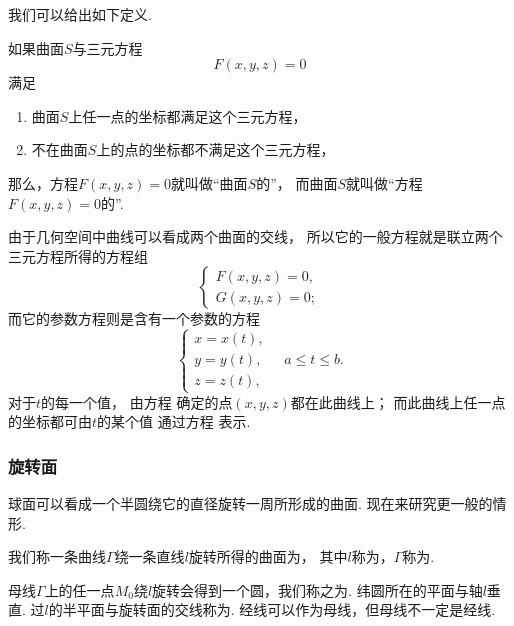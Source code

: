 我们可以给出如下定义.
\begin{definition}
如果曲面\(S\)与三元方程\[
	F(x,y,z)=0
\]满足
\begin{enumerate}
	\item 曲面\(S\)上任一点的坐标都满足这个三元方程，
	\item 不在曲面\(S\)上的点的坐标都不满足这个三元方程，
\end{enumerate}
那么，方程\(F(x,y,z)=0\)就叫做“曲面\(S\)的”，
而曲面\(S\)就叫做“方程\(F(x,y,z)=0\)的”.
\end{definition}

由于几何空间中曲线可以看成两个曲面的交线，
所以它的一般方程就是联立两个三元方程所得的方程组\[
	\left\{ \begin{array}{l}
		F(x,y,z) = 0, \\
		G(x,y,z) = 0;
	\end{array} \right.
\]
而它的参数方程则是含有一个参数的方程
\begin{equation}\label{equation:解析几何.曲线的参数方程}
	\left\{ \begin{array}{l}
		x = x(t), \\
		y = y(t), \\
		z = z(t),
	\end{array} \right.
	\quad
	a \leq t \leq b.
\end{equation}
对于\(t\)的每一个值，
由方程  确定的点\((x,y,z)\)都在此曲线上；
而此曲线上任一点的坐标都可由\(t\)的某个值
通过方程  表示.

\subsubsection{旋转面}
球面可以看成一个半圆绕它的直径旋转一周所形成的曲面.
现在来研究更一般的情形.

我们称一条曲线\(\Gamma\)绕一条直线\(l\)旋转所得的曲面为，
其中\(l\)称为，\(\Gamma\)称为.

母线\(\Gamma\)上的任一点\(M_0\)绕\(l\)旋转会得到一个圆，我们称之为.
纬圆所在的平面与轴\(l\)垂直.
过\(l\)的半平面与旋转面的交线称为.
经线可以作为母线，但母线不一定是经线.


